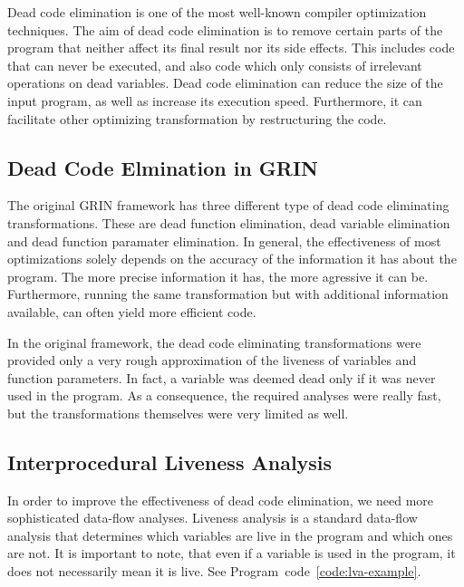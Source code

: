 \documentclass[main.tex]{subfiles}
\begin{document}
	
	Dead code elimination is one of the most well-known compiler optimization techniques. The aim of dead code elimination is to remove certain parts of the program that neither affect its final result nor its side effects. This includes code that can never be executed, and also code which only consists of irrelevant operations on dead variables. Dead code elimination can reduce the size of the input program, as well as increase its execution speed. Furthermore, it can facilitate other optimizing transformation by restructuring the code.
	
	\subsection{Dead Code Elmination in GRIN}
	
	The original GRIN framework has three different type of dead code eliminating transformations. These are dead function elimination, dead variable elimination and dead function paramater elimination. In general, the effectiveness of most optimizations solely depends on the accuracy of the information it has about the program. The more precise information it has, the more agressive it can be. Furthermore, running the same transformation but with additional information available, can often yield more efficient code.
	
	In the original framework, the dead code eliminating transformations were provided only a very rough approximation of the liveness of variables and function parameters. In fact, a variable was deemed dead only if it was never used in the program. As a consequence, the required analyses were really fast, but the transformations themselves were very limited as well.
	
	\subsection{Interprocedural Liveness Analysis} \label{sub-sec:lva}
	
	In order to improve the effectiveness of dead code elimination, we need more sophisticated data-flow analyses. Liveness analysis is a standard data-flow analysis that determines which variables are live in the program and which ones are not. It is important to note, that even if a variable is used in the program, it does not necessarily mean it is live. See Program~code~\ref{code:lva-example}.
	
\end{document}

